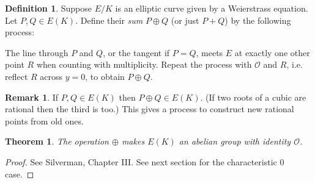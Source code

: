 \documentclass[a4paper]{article}
\newtheorem{theorem}{Theorem}
\theoremstyle{definition}
\newtheorem*{definition}{Definition}
\newtheorem*{remark}{Remark}
\renewcommand{\O}{\mathcal{O}}
\begin{document}
\begin{definition}
    Suppose $E/K$ is an elliptic curve given by a Weierstrass equation. Let
    $P,Q\in E(K)$. Define their \emph{sum} $P\oplus Q$ (or just $P+Q$) by the
    following process:
    \begin{figure}[htb]
        \centering
    \end{figure}

    The line through $P$ and $Q$, or the tangent if $P=Q$, meets $E$ at exactly
    one other point $R$ when counting with multiplicity. Repeat the process with
    $\O$ and $R$, i.e. reflect $R$ across $y=0$, to obtain $P\oplus Q$.
\end{definition}

\begin{remark}
    If $P,Q\in E(K)$ then $P\oplus Q\in E(K)$. (If two roots of a cubic are
    rational then the third is too.) This gives a process to construct new
    rational points from old ones.
\end{remark}

\begin{theorem}
    The operation $\oplus$ makes $E(K)$ an abelian group with identity $\O$.
\end{theorem}

\begin{proof}
    See Silverman, Chapter III. See next section for the characteristic 0 case.
\end{proof}
\end{document}
